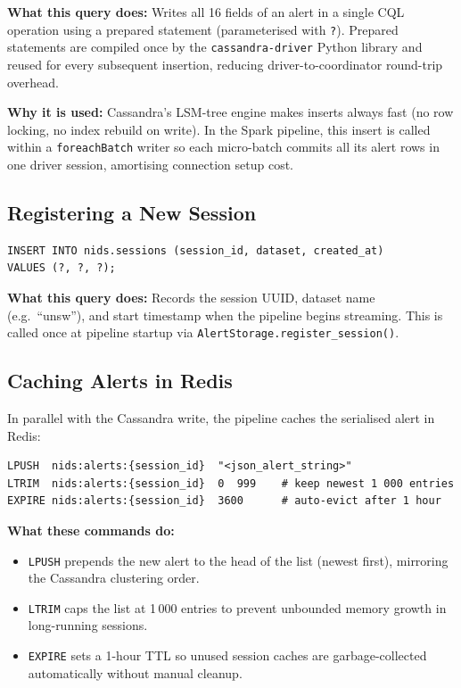 \documentclass[12pt,a4paper]{report}
\begin{document}
\textbf{What this query does:}  Writes all 16 fields of an alert in a single
CQL operation using a prepared statement (parameterised with \texttt{?}).
Prepared statements are compiled once by the \texttt{cassandra-driver} Python
library and reused for every subsequent insertion, reducing driver-to-coordinator
round-trip overhead.

\textbf{Why it is used:}  Cassandra's LSM-tree engine makes inserts always fast
(no row locking, no index rebuild on write).  In the Spark pipeline, this
insert is called within a \texttt{foreachBatch} writer so each micro-batch
commits all its alert rows in one driver session, amortising connection setup
cost.

\subsection{Registering a New Session}
\begin{lstlisting}[style=cqlstyle,
  caption={CQL: Register a new streaming session},
  label={lst:insert-session}]
INSERT INTO nids.sessions (session_id, dataset, created_at)
VALUES (?, ?, ?);
\end{lstlisting}

\textbf{What this query does:}  Records the session UUID, dataset name
(e.g.\ ``unsw''), and start timestamp when the pipeline begins streaming.
This is called once at pipeline startup via \texttt{AlertStorage.register\_session()}.

\subsection{Caching Alerts in Redis}
In parallel with the Cassandra write, the pipeline caches the serialised alert
in Redis:

\begin{lstlisting}[style=bashstyle,
  caption={Redis commands: push alert to cache and manage TTL},
  label={lst:redis-push}]
LPUSH  nids:alerts:{session_id}  "<json_alert_string>"
LTRIM  nids:alerts:{session_id}  0  999    # keep newest 1 000 entries
EXPIRE nids:alerts:{session_id}  3600      # auto-evict after 1 hour
\end{lstlisting}

\textbf{What these commands do:}
\begin{itemize}
  \item \texttt{LPUSH} prepends the new alert to the head of the list (newest
        first), mirroring the Cassandra clustering order.
  \item \texttt{LTRIM} caps the list at 1\,000 entries to prevent unbounded
        memory growth in long-running sessions.
  \item \texttt{EXPIRE} sets a 1-hour TTL so unused session caches are
        garbage-collected automatically without manual cleanup.
\end{itemize}
\end{document}
